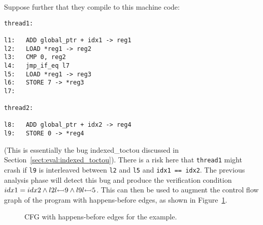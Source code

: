 Suppose further that they compile to this machine code:

\begin{verbatim}
thread1:

l1:   ADD global_ptr + idx1 -> reg1
l2:   LOAD *reg1 -> reg2
l3:   CMP 0, reg2
l4:   jmp_if_eq l7
l5:   LOAD *reg1 -> reg3
l6:   STORE 7 -> *reg3
l7:

thread2:

l8:   ADD global_ptr + idx2 -> reg4
l9:   STORE 0 -> *reg4
\end{verbatim}

(This is essentially the bug indexed\_toctou discussed in
Section~\ref{sect:eval:indexed_toctou}).  There is a risk here that
\verb|thread1| might crash if \verb|l9| is interleaved between
\verb|l2| and \verb|l5| and \verb|idx1 == idx2|.  The previous
analysis phase will detect this bug and produce the verification
condition $idx1 = idx2 \wedge l2 l {\leftarrowtail} 9 \wedge l9
l {\leftarrowtail} 5$.  This can then be used to augment the control flow
graph of the program with happens-before edges, as shown in
Figure~\ref{fig:using:example_hb_graph}.

\begin{figure}
  \caption{CFG with happens-before edges for the example.}
  \label{fig:using:example_hb_graph}
\end{figure}

